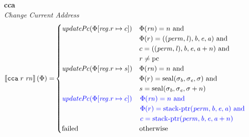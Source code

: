 \documentclass[a4paper]{article}
\begin{document}
\noindent\textbf{cca}\\
\emph{Change Current Address}
\\
\begin{align*}
  \sem{\tcca{r}{\rn}}(\Phi) = & 
                                  \begin{cases}
                                    \updPcAddr{\Phi\updReg{r}{c}} &  
                                    \arraycolsep=0pt
                                    \begin{array}[t]{l}
                                      \Phi(\rn) = n \tand \\
                                      \Phi(r) = ((\perm,\lin),\baddr,\eaddr,\aaddr) \tand \\
                                      c = ((\perm,\lin),\baddr,\eaddr,\aaddr + n) \tand\\
                                      r \neq \pcreg
                                    \end{array}
                                    \\
                                    \updPcAddr{\Phi\updReg{r}{s}} &  
                                    \arraycolsep=0pt
                                    \begin{array}[t]{l}
                                      \Phi(\rn) = n \tand \\
                                      \Phi(r) = \seal{\sigma_\baddr,\sigma_\eaddr,\sigma} \tand \\
                                      s = \seal{\sigma_\baddr,\sigma_\eaddr,\sigma + n}
                                    \end{array}
                                    \\
                                    \src{\updPcAddr{\Phi\updReg{r}{c}}} &  
                                    \sourcecolor\left.
                                    \arraycolsep=0pt
                                    \begin{array}[t]{l}
                                      \Phi(\rn) = n\tand \\
                                      \Phi(r) = \stkptr{\perm,\baddr,\eaddr,\aaddr} \tand \\
                                      c = \stkptr{\perm,\baddr,\eaddr,\aaddr + n}
                                    \end{array}\right.
                                    \\
                                    \failed & \totherwise
                                  \end{cases}
\end{align*}
\end{document}
